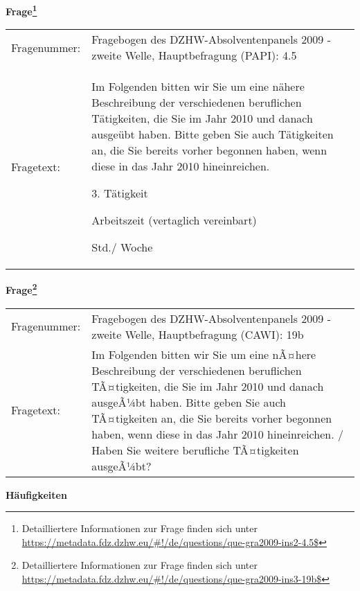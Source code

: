 				\vspace*{0.5cm}
                \noindent\textbf{Frage\footnote{Detailliertere Informationen zur Frage finden sich unter
		              \url{https://metadata.fdz.dzhw.eu/\#!/de/questions/que-gra2009-ins2-4.5$}}}\\
				\begin{tabularx}{\hsize}{@{}lX}
					Fragenummer: &
					  Fragebogen des DZHW-Absolventenpanels 2009 - zweite Welle, Hauptbefragung (PAPI):
					  4.5
 \\
					Fragetext: & Im Folgenden bitten wir Sie um eine nähere Beschreibung der verschiedenen beruflichen Tätigkeiten, die Sie im Jahr 2010 und danach ausgeübt haben. Bitte geben Sie auch Tätigkeiten an, die Sie bereits vorher begonnen haben, wenn diese in das Jahr 2010 hineinreichen.\par  3. Tätigkeit\par  Arbeitszeit (vertaglich vereinbart)\par  Std./ Woche \\
				\end{tabularx}
				\vspace*{0.5cm}
                \noindent\textbf{Frage\footnote{Detailliertere Informationen zur Frage finden sich unter
		              \url{https://metadata.fdz.dzhw.eu/\#!/de/questions/que-gra2009-ins3-19b$}}}\\
				\begin{tabularx}{\hsize}{@{}lX}
					Fragenummer: &
					  Fragebogen des DZHW-Absolventenpanels 2009 - zweite Welle, Hauptbefragung (CAWI):
					  19b
 \\
					Fragetext: & Im Folgenden bitten wir Sie um eine nÃ¤here Beschreibung der verschiedenen beruflichen TÃ¤tigkeiten, die Sie im Jahr 2010 und danach ausgeÃ¼bt haben. Bitte geben Sie auch TÃ¤tigkeiten an, die Sie bereits vorher begonnen haben, wenn diese in das Jahr 2010 hineinreichen. / Haben Sie weitere berufliche TÃ¤tigkeiten ausgeÃ¼bt? \\
				\end{tabularx}





        		\vspace*{0.5cm}
                \noindent\textbf{Häufigkeiten}

